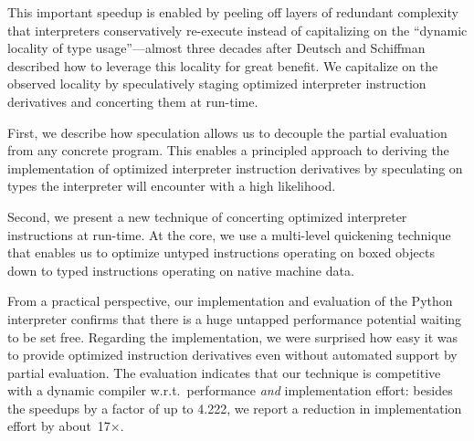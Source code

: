 \documentclass[preprint,10pt]{popl14conf}
\newcommand{\namasteMaxSU}{4.222}
\begin{document}
This important speedup is enabled by peeling off layers of redundant complexity that interpreters
conservatively re-execute instead of capitalizing on the ``dynamic locality of type usage''---almost
three decades after Deutsch and Schiffman described how to leverage this locality for great benefit.
We capitalize on the observed locality by speculatively staging optimized interpreter instruction
derivatives and concerting them at run-time.

First, we describe how speculation allows us to decouple the partial evaluation from any concrete
program.
This enables a principled approach to deriving the implementation of optimized interpreter
instruction derivatives by speculating on types the interpreter will encounter with a high
likelihood.

Second, we present a new technique of concerting optimized interpreter instructions at run-time.
At the core, we use a multi-level quickening technique that enables us to optimize untyped
instructions operating on boxed objects down to typed instructions operating on native machine
data.

From a practical perspective, our implementation and evaluation of the Python interpreter confirms
that there is a huge untapped performance potential waiting to be set free.
Regarding the implementation, we were surprised how easy it was to provide optimized instruction
derivatives even without automated support by partial evaluation.
The evaluation indicates that our technique is competitive with a dynamic compiler
w.r.t.~performance \emph{and} implementation effort: besides the speedups by a factor of up
to \namasteMaxSU{}, we report a reduction in implementation effort by about~17$\times$.











\end{document}
